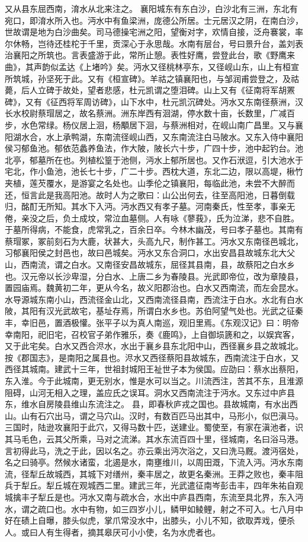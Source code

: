 \documentclass[12pt,UTF8]{ctexbook}
\begin{document}
又从县东屈西南，淯水从北来注之。
襄阳城东有东白沙，白沙北有三洲，东北有宛口，即淯水所入也。沔水中有鱼梁洲，庞德公所居。士元居汉之阴，在南白沙，世故谓是地为白沙曲矣。司马德操宅洲之阳，望衡对字，欢情自接，泛舟褰裳，率尔休畅，岂待还桂柁于千里，贡深心于永思哉。水南有层台，号曰景升台，盖刘表治襄阳之所筑也。言表盛游于此，常所止憩。表性好鹰，尝登此台，歌《野鹰来曲》，其声韵似孟达《上堵吟》矣。沔水又径桃林亭东，又径岘山东，山上有桓宣所筑城，孙坚死于此。又有《桓宣碑》。羊祜之镇襄阳也，与邹润甫尝登之，及祜薨，后人立碑于故处，望者悲感，杜元凯谓之堕泪碑。山上又有《征南将军胡罴碑》，又有《征西将军周访碑》，山下水中，杜元凯沉碑处。沔水又东南径蔡洲，汉长水校尉蔡瑁居之，故名蔡洲。洲东岸西有洄湖，停水数十亩，长数里，广减百步，水色常绿。杨仪居上洄，杨顒居下洄，与蔡洲相对，在岘山南广昌里。又与襄阳湖水合，水上承鸭湖，东南流径岘山西，又东南流注白马陂水。又东入侍中襄阳侯习郁鱼池。郁依范蠡养鱼法，作大陂，陂长六十步，广四十步，池中起钓台。池北亭，郁墓所在也。列植松篁于池侧，沔水上郁所居也。又作石洑逗，引大池水于宅北，作小鱼池，池长七十步，广二十步。西枕大道，东北二边，限以高堤，楸竹夹植，莲芡覆水，是游宴之名处也。山季伦之镇襄阳，每临此池，未尝不大醉而还，恒言此是我高阳池。故时人为之歌曰：山公出何去，往至高阳池，日暮倒载归，酩酊无所知。其水下入沔。沔水西又有孝子墓。河南秦氏，性至孝，事亲无倦，亲没之后，负土成坟，常泣血墓侧。人有咏《蓼莪》，氏为泣涕，悲不自胜。于墓所得病，不能食，虎常乳之，百余日卒。今林木幽茂，号曰孝子墓也。其南有蔡瑁冢，冢前刻石为大鹿，状甚大，头高九尺，制作甚工。沔水又东南径邑城北，习郁襄阳侯之封邑也，故曰邑城矣。沔水又东合洞口，水出安昌县故城东北大父山，西南流，谓之白水。又南径安昌故城东，屈径其县南，县，故蔡阳之白水乡也。汉元帝以长沙卑湿，分白水、上唐二乡为春陵县。光武即帝位，改为章陵县，置园庙焉。魏黄初二年，更从今名，故义阳郡治也。白水又西南流，而左会昆水。水导源城东南小山，西流径金山北，又西南流径县南，西流注于白水。水北有白水陂，其阳有汉光武故宅，基址存焉，所谓白水乡也。苏伯阿望气处也。光武之征秦丰，幸旧邑，置酒极懽。张平子以为真人南巡，观旧里焉。《东观汉记》曰：明帝幸南阳，祀旧宅，召校官子弟作雅乐，奏《鹿鸣》，上自御埙篪和之，以娱宾客，又于此宅矣。白水又西合浕水，水出于襄乡县东北阳中山，西径襄乡县之故城北。按《郡国志》，是南阳之属县也。浕水又西径蔡阳县故城东，西南流注于白水，又西径其城南。建武十三年，世祖封城阳王祉世子本为侯国。应劭曰：蔡水出蔡阳，东入淮。今于此城南，更无别水，惟是水可以当之。川流西注，苦其不东，且淮源阻碍，山河无相入之理，盖应氏之误耳。洞水又西南流注于沔水。又东过中庐县东，维水自房陵县维山东流注之。
县，即春秋庐戎之国也。县故城南，有水出西山。山有石穴出马，谓之马穴山。汉时，有数百匹马出其中，马形小，似巴滇马。三国时，陆逊攻襄阳于此穴，又得马数十匹，送建业。蜀使至，有家在滇池者，识其马毛色，云其父所乘，马对之流涕。其水东流百四十里，径城南，名曰浴马港。言初得此马，洗之于此，因以名之。亦云乘出沔次浴之，又曰洗马厩。渡沔宿处，名之曰骑亭。然候水诸蛮，北遏是水，南壅维川，以周田溉，下流入沔。沔水东南流，径犁丘故城西，其城下对缮州，秦丰居之，故更名秦洲。王莽之败也，秦丰阻兵于犁丘。犁丘城在观城西二里。建武三年，光武遣征南岑彭击丰，四年朱祐自观城擒丰子犁丘是也。沔水又南与疏水合，水出中庐县西南，东流至具北界，东入沔水，谓之疏口也。水中有物，如三四岁小儿，鳞甲如鲮鲤，射之不可入。七八月中好在碛上自曝，膝头似虎，掌爪常没水中，出膝头，小儿不知，欲取弄戏，便杀人。或曰人有生得者，摘其皋厌可小小使，名为水虎者也。
\end{document}
